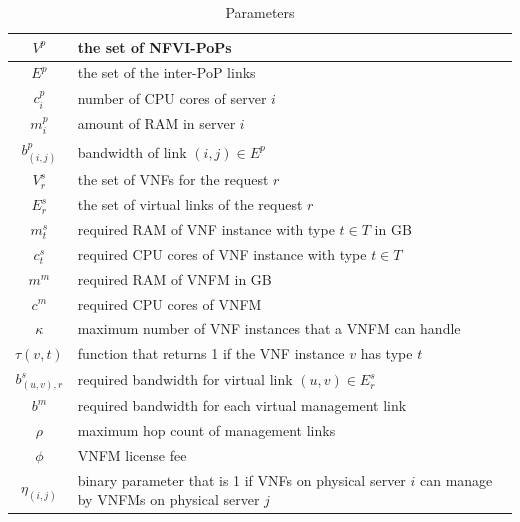 \begin{table}
    \caption{Parameters}
    \label{tbl:parameters}
    \begin{small}
    \begin{center}\begin{tabular}{|c|p{}|}
    \hline
    \(V^p\) & the set of NFVI-PoPs \\
    \hline
    \(E^p\) & the set of the inter-PoP links \\
    \hline
    \(c^p_i\) & number of CPU cores of server \(i\) \\
    \hline
    \(m^p_i\) & amount of RAM in server \(i\) \\
    \hline
    \(b^p_{(i,j)}\) & bandwidth of link \((i, j) \in E^p \) \\
    \hline
    \(V^s_r\) & the set of VNFs for the request \(r\) \\
    \hline
    \(E^s_r\) & the set of virtual links of the request \(r\) \\
    \hline
    \(m^s_t\) & required RAM of VNF instance with type \(t \in T\) in GB \\
    \hline
    \(c^s_t\) & required CPU cores of VNF instance with type \(t \in T\) \\
    \hline
    \(m^m\) & required RAM of VNFM in GB \\
    \hline
    \(c^m\) & required CPU cores of VNFM \\
    \hline
    \(\kappa\) & maximum number of VNF instances that a VNFM can handle \\
    \hline
    \(\tau(v, t)\) & function that returns 1 if the VNF instance \(v\) has type \(t\)  \\
    \hline
    \(b^s_{(u, v),r}\) & required bandwidth for virtual link \((u, v) \in E^s_r\) \\
    \hline
    \(b^m\) & required bandwidth for each virtual management link \\
    \hline
    \(\rho\) & maximum hop count of management links \\
    \hline
    \(\phi\) & VNFM license fee \\
    \hline
    \(\eta_{(i, j)}\) & binary parameter that is 1 if VNFs on physical server \(i\) can manage by VNFMs on physical server \(j\) \\
    \hline
    \end{tabular}\end{center}
    \end{small}
\end{table}

